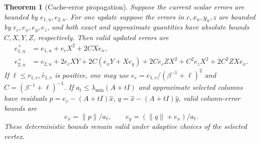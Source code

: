\documentclass[11pt]{article}
\newtheorem{theorem}{Theorem}
\begin{document}
\begin{theorem}[Cache-error propagation]\label{thm:cache}
Suppose the current scalar errors are bounded by $e_{1,u},e_{2,u}$.
For one update suppose the errors in $c,x_u,y_u,z$ are bounded by
$e_c,e_x,e_y,e_z$, and both exact and approximate quantities have
absolute bounds $C,X,Y,Z$, respectively. Then valid updated errors are
\begin{align}
 e_{1,u}^+&=e_{1,u}+e_cX^2+2CXe_x,\label{eq:cacheone}\\
 e_{2,u}^+&=e_{2,u}+2e_cXY+2C(e_xY+Xe_y)
       +2Ce_cZX^2+C^2e_zX^2+2C^2ZXe_x.\label{eq:cachetwo}
\end{align}
If $\ell\leq r_{1,v},\widehat r_{1,v}$ is positive, one may use
$e_c=e_{1,v}/(\beta^{-1}+\ell)^2$ and $C=(\beta^{-1}+\ell)^{-1}$.
If $a_t\leq\lambda_{\min}(A+tI)$ and approximate selected columns
have residuals $p=e_v-(A+tI)\widehat x$,
$q=\widehat x-(A+tI)\widehat y$, valid column-error bounds are
\[
 e_x=\|p\|/a_t,\qquad e_y=(\|q\|+e_x)/a_t.
\]
These deterministic bounds remain valid under adaptive choices of
the selected vertex.
\end{theorem}
\end{document}
